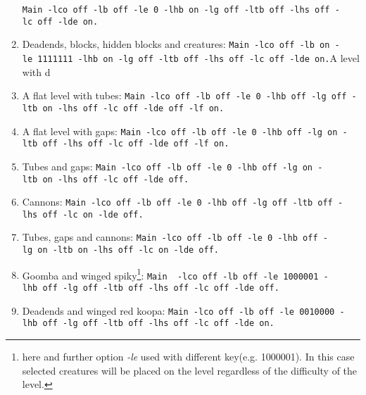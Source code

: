 \documentclass{report}
\begin{document}
\begin{enumerate}
\texttt{Main~-lco~off~-lb~off~-le~0~-lhb~on~-lg~off~-ltb~off~-lhs~off~-lc~off~-lde~on.}
\item Deadends, blocks, hidden blocks and creatures:\newline %
\texttt{Main~-lco~off~-lb~on~-le~1111111~-lhb~on~-lg~off~-ltb~off~-lhs~off~-lc~off~-lde~on.}A level with d
\item A flat level with tubes: \newline %
\texttt{Main~-lco~off~-lb~off~-le~0~-lhb~off~-lg~off~-ltb~on~-lhs~off~-lc~off~-lde~off~-lf~on.}
\item A flat level with gaps: \newline %
\texttt{Main~-lco~off~-lb~off~-le~0~-lhb~off~-lg~on~-ltb~off~-lhs~off~-lc~off~-lde~off~-lf~on.}
\item Tubes and gaps: \newline %
\texttt{Main~-lco~off~-lb~off~-le~0~-lhb~off~-lg~on~-ltb~on~-lhs~off~-lc~off~-lde~off.}
\item Cannons: \newline %
\texttt{Main~-lco~off~-lb~off~-le~0~-lhb~off~-lg~off~-ltb~off~-lhs~off~-lc~on~-lde~off.}
\item Tubes, gaps and cannons: \newline %
\texttt{Main~-lco~off~-lb~off~-le~0~-lhb~off~-lg~on~-ltb~on~-lhs~off~-lc~on~-lde~off.}
\item Goomba and winged spiky\footnote{here and further option \emph{-le} used with different key(e.g. 1000001). In this case selected creatures will be placed on the level regardless of the difficulty of the level.}: \newline %
\texttt{Main ~-lco~off~-lb~off~-le~1000001~-lhb~off~-lg~off~-ltb~off~-lhs~off~-lc~off~-lde~off.}
\item Deadends and winged red koopa: \newline %
\texttt{Main~-lco~off~-lb~off~-le~0010000~-lhb~off~-lg~off~-ltb~off~-lhs~off~-lc~off~-lde~on.}


\end{enumerate}
\end{document}
